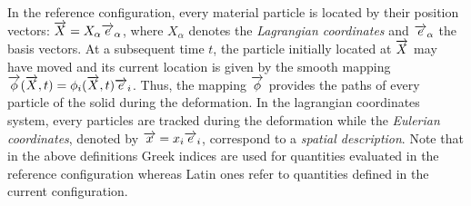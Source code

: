 In the reference configuration, every material particle is located by their position vectors: ${\overrightarrow{X}}=X_\alpha {\overrightarrow{e}}_\alpha$, where $X_\alpha$ denotes the \textit{Lagrangian coordinates} and ${\overrightarrow{e}}_\alpha$ the basis vectors. At a subsequent time $t$, the particle initially located at ${\overrightarrow{X}}$ may have moved and its current location is given by the smooth mapping ${\overrightarrow{\phi}}({\overrightarrow{X}},t)=\phi_i({\overrightarrow{X}},t){\overrightarrow{e}}_i$. Thus, the mapping ${\overrightarrow{\phi}}$ provides the paths of every particle of the solid during the deformation. In the lagrangian coordinates system, every particles are tracked during the deformation while the \textit{Eulerian coordinates}, denoted by ${\overrightarrow{x}}=x_i{\overrightarrow{e}}_i$, correspond to a \textit{spatial description}.
Note that in the above definitions Greek indices are used for quantities evaluated in the reference configuration whereas Latin ones refer to quantities defined in the current configuration. 

